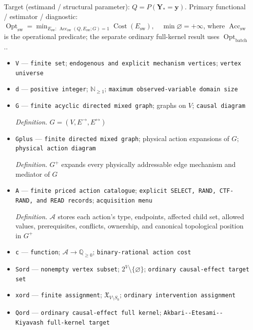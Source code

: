 \documentclass{article}
\begin{document}
Target (estimand / structural parameter): \(Q=P(\mathbf Y_{\ast}=\mathbf y)\).
Primary functional / estimator / diagnostic: \(\operatorname{Opt}_{\mathrm{sw}}=\min_{E_{\mathrm{sw}}:\,\operatorname{Acc}_{\mathrm{sw}}(Q,E_{\mathrm{sw}};G)=1}\operatorname{Cost}(E_{\mathrm{sw}}),\quad\min\varnothing=+\infty\), where \(\operatorname{Acc}_{\mathrm{sw}}\) is the operational predicate; the separate ordinary full-kernel result uses \(\operatorname{Opt}_{\mathrm{batch}}\)..
\begin{itemize}
  \item \texttt{V} --- \texttt{finite set}; \texttt{endogenous and explicit mechanism vertices}; \texttt{vertex universe}
  \item \texttt{d} --- \texttt{positive integer}; \(\mathbb N_{\ge 1}\); \texttt{maximum observed-\allowbreak{}variable domain size}
  \item \texttt{G} --- \texttt{finite acyclic directed mixed graph}; graphs on \(V\); \texttt{causal diagram}
  \par\smallskip\noindent\emph{Definition.} \(G=(V,E^{\to},E^{\leftrightarrow})\)
  \item \texttt{Gplus} --- \texttt{finite directed mixed graph}; physical action expansions of \(G\); \texttt{physical action diagram}
  \par\smallskip\noindent\emph{Definition.} \(G^{+}\) expands every physically addressable edge mechanism and mediator of \(G\)
  \item \texttt{A} --- \texttt{finite priced action catalogue}; \texttt{explicit SELECT,\allowbreak{} RAND,\allowbreak{} CTF-\allowbreak{}RAND,\allowbreak{} and READ records}; \texttt{acquisition menu}
  \par\smallskip\noindent\emph{Definition.} \(\mathcal A\) stores each action's type, endpoints, affected child set, allowed values, prerequisites, conflicts, ownership, and canonical topological position in \(G^{+}\)
  \item \texttt{c} --- \texttt{function}; \(\mathcal A\to\mathbb Q_{\ge 0}\); \texttt{binary-\allowbreak{}rational action cost}
  \item \texttt{Sord} --- \texttt{nonempty vertex subset}; \(2^V\setminus\{\varnothing\}\); \texttt{ordinary causal-\allowbreak{}effect target set}
  \item \texttt{xord} --- \texttt{finite assignment}; \(\mathfrak X_{V\setminus S_0}\); \texttt{ordinary intervention assignment}
  \item \texttt{Qord} --- \texttt{ordinary causal-\allowbreak{}effect full kernel}; \texttt{Akbari-\allowbreak{}-\allowbreak{}Etesami-\allowbreak{}-\allowbreak{}Kiyavash full-\allowbreak{}kernel target}

\end{itemize}
\end{document}
